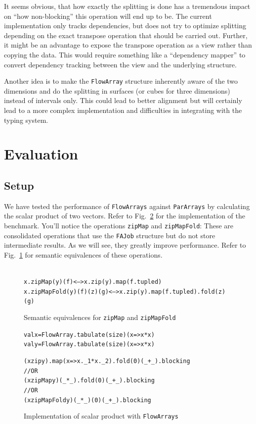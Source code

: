 \documentclass[runningheads,a4paper,fleqn]{llncs}
\begin{document}
It seems obvious, that how exactly the splitting is done has a
tremendous 
impact on ``how non-blocking'' this operation will end up to be. The
current implementation only tracks dependencies, but does not try to
optimize splitting depending on the exact transpose operation that
should be carried out. Further, it might be an advantage to expose the
transpose operation as a view rather than copying the data. This would
require something like a ``dependency mapper'' to convert dependency
tracking between the view and the underlying structure.

Another idea is to make the \texttt{FlowArray} structure inherently aware of
the two dimensions and do the splitting in surfaces (or cubes for
three dimensions) instead of intervals only. This could lead to better
alignment but will certainly lead to a more complex implementation and
difficulties in integrating with the typing system.

\section{Evaluation}
\label{sec:evaluation}

\subsection{Setup}

We have tested the performance of \texttt{FlowArrays} against
\texttt{ParArrays} by calculating the scalar product of two vectors. Refer to
Fig.~\ref{fig:scalar-product} for the implementation of the
benchmark. You'll notice the operations \texttt{zipMap} and
\texttt{zipMapFold}: These are consolidated operations that use the
\texttt{FAJob} structure but do not store intermediate results. As we
will see, they greatly improve performance. Refer to
Fig.~\ref{fig:zipmapfold-semeq} for semantic equivalences of these
operations. 

\begin{figure}
\begin{alltt}{\scriptsize
x.zipMap(y)(f)             <-->  x.zip(y).map(f.tupled)
x.zipMapFold(y)(f)(z)(g)   <-->  x.zip(y).map(f.tupled).fold(z)(g)}
\end{alltt}
\caption{Semantic equivalences for \texttt{zipMap} and
  \texttt{zipMapFold}}
\label{fig:zipmapfold-semeq}
\end{figure}

\begin{figure}
\begin{minipage}[t]{6cm}
\begin{alltt}
{\scriptsize
val x = FlowArray.tabulate(size)(x => x*x)
val y = FlowArray.tabulate(size)(x => x*x)

(x zip y).map(x => x._1 * x._2).fold(0)(_ + _).blocking
// OR
(x zipMap y)(_ * _).fold(0)(_ + _).blocking
// OR
(x zipMapFold y)(_ * _)(0)(_ + _).blocking
}
\end{alltt}
\end{minipage}
\caption{Implementation of scalar product with \texttt{FlowArrays}}
\label{fig:scalar-product}
\end{figure}
\end{document}
